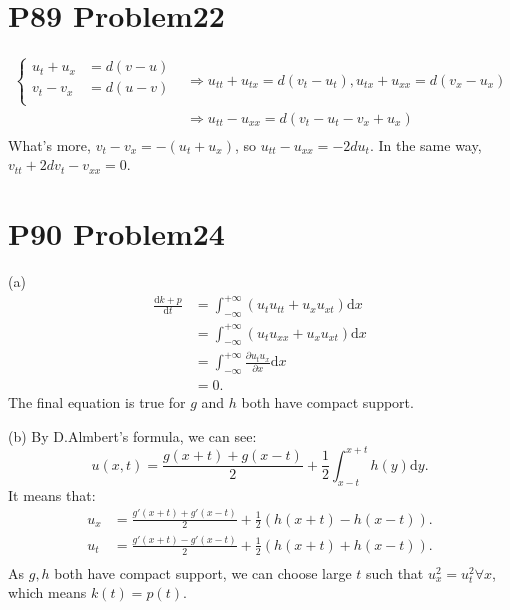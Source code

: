 \documentclass[a4paper]{ctexart}
\newcommand{\dif}{\mathrm{d}}
\newcommand{\difFrac}[2]{\frac{\dif #1}{\dif #2}}
\newcommand{\pdfFrac}[2]{\frac{\partial #1}{\partial #2}}
\begin{document}
\section*{P89 Problem22}
\begin{equation}
    \begin{aligned}
    \left\{
        \begin{aligned}
            u_{t}+u_{x}&=d(v-u)\\
            v_{t}-v_{x}&=d(u-v)\\
        \end{aligned}
    \right.
    &\Rightarrow u_{tt}+u_{tx}=d(v_{t}-u_{t}),u_{tx}+u_{xx}=d(v_{x}-u_{x})\\
    &\Rightarrow u_{tt}-u_{xx}=d(v_{t}-u_{t}-v_{x}+u_{x})\\
    \end{aligned}
\end{equation}
What's more, $v_{t}-v_{x}=-(u_{t}+u_{x})$, so $u_{tt}-u_{xx}=-2du_{t}$. In the same way, $v_{tt}+2dv_{t}-v_{xx}=0$.
\section*{P90 Problem24}
(a)
\begin{equation}
    \begin{aligned}
        \difFrac{k+p}{t}&=\int_{-\infty}^{+\infty}(u_{t}u_{tt}+u_{x}u_{xt})\dif x\\
        &=\int_{-\infty}^{+\infty}(u_{t}u_{xx}+u_{x}u_{xt})\dif x\\
        &=\int_{-\infty}^{+\infty}\pdfFrac{u_{t}u_{x}}{x}\dif x\\
        &=0.
    \end{aligned}
\end{equation}
The final equation is true for $g$ and $h$ both have compact support.

(b)
By D.Almbert's formula, we can see:
\begin{equation}
    u(x,t)=\frac{g(x+t)+g(x-t)}{2}+\frac{1}{2}\int_{x-t}^{x+t}h(y)\dif y.
\end{equation}
It means that:
\begin{equation}
    \begin{aligned}
    u_{x}&=\frac{g'(x+t)+g'(x-t)}{2}+\frac{1}{2}(h(x+t)-h(x-t)).\\
    u_{t}&=\frac{g'(x+t)-g'(x-t)}{2}+\frac{1}{2}(h(x+t)+h(x-t)).\\
    \end{aligned}
\end{equation}
As $g,h$ both have compact support, we can choose large $t$ such that $u_{x}^{2}=u_{t}^{2}\forall x$, which means $k(t)=p(t)$.
\end{document}
